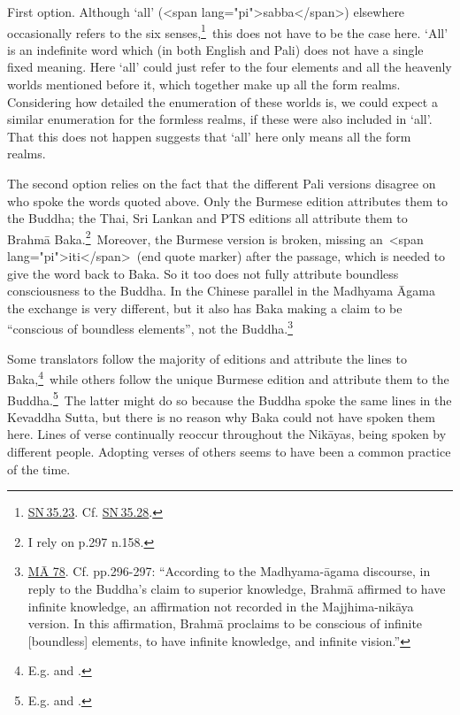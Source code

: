 \documentclass[10pt, openright]{book}
\begin{document}
First option. Although ‘all’ (<span lang="pi">sabba</span>) elsewhere occasionally refers to the six senses,\footnote {\href{https://suttacentral.net/sn35.23/en/sujato}{SN 35.23}. Cf. \href{https://suttacentral.net/sn35.28/en/sujato}{SN 35.28}.} this does not have to be the case here. ‘All’ is an indefinite word which (in both English and Pali) does not have a single fixed meaning. Here ‘all’ could just refer to the four elements and all the heavenly worlds mentioned before it, which together make up all the form realms. Considering how detailed the enumeration of these worlds is, we could expect a similar enumeration for the formless realms, if these were also included in ‘all’. That this does not happen suggests that ‘all’ here only means all the form realms.


The second option relies on the fact that the different Pali versions disagree on who spoke the words quoted above. Only the Burmese edition attributes them to the Buddha; the Thai, Sri Lankan and PTS editions all attribute them to Brahmā Baka.\footnote {I rely on \cite{Anālayo 2010} p.297 n.158.} Moreover, the Burmese version is broken, missing an <span lang="pi">iti</span> (end quote marker) after the passage, which is needed to give the word back to Baka. So it too does not fully attribute boundless consciousness to the Buddha. In the Chinese parallel in the Madhyama Āgama the exchange is very different, but it also has Baka making a claim to be “conscious of boundless elements”, not the Buddha.\footnote {\href{https://suttacentral.net/ma78}{MĀ 78}. Cf. \cite{Anālayo 2010} pp.296-297: “According to the Madhyama-āgama discourse, in reply to the Buddha's claim to superior knowledge, Brahmā affirmed to have infinite knowledge, an affirmation not recorded in the Majjhima-nikāya version. In this affirmation, Brahmā proclaims to be conscious of infinite [boundless] elements, to have infinite knowledge, and infinite vision.”}


Some translators follow the majority of editions and attribute the lines to Baka,\footnote {E.g. \cite{Horner} and \cite{Sujato 2018}.} while others follow the unique Burmese edition and attribute them to the Buddha.\footnote {E.g. \cite{Ñāṇamoli} and \cite{Ṭhānissaro}.} The latter might do so because the Buddha spoke the same lines in the Kevaddha Sutta, but there is no reason why Baka could not have spoken them here. Lines of verse continually reoccur throughout the Nikāyas, being spoken by different people. Adopting verses of others seems to have been a common practice of the time.
\end{document}
